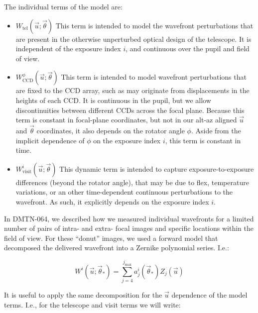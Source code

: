 \documentclass{article}
\begin{document}
The individual terms of the model are:

\begin{itemize}

  \item $W_\mathrm{tel}\left(\vec{u}; \vec{\theta}\right)$  This term is
  intended to model the wavefront perturbations that are present in the
  otherwise unperturbed optical design of the telescope.  It is independent of
  the exposure index $i$, and continuous over the pupil and field of view.

  \item $W_\mathrm{CCD}^\phi\left(\vec{u}; \vec{\theta}\right)$  This term is
  intended to model wavefront perturbations that are fixed to the CCD array,
  such as may originate from displacements in the heights of each CCD. It is
  continuous in the pupil, but we allow discontinuities between different CCDs
  across the focal plane.  Because this term is constant in focal-plane
  coordinates, but not in our alt-az aligned $\vec{u}$ and $\vec{\theta}$
  coordinates, it also depends on the rotator angle $\phi$.  Aside from the
  implicit dependence of $\phi$ on the exposure index $i$, this term is constant
  in time.

  \item $W_\mathrm{visit}^i\left(\vec{u}; \vec{\theta}\right)$  This dynamic
  term is intended to capture exposure-to-exposure differences (beyond the
  rotator angle), that may be due to flex, temperature variations, or an other
  time-dependent continuous perturbations to the wavefront.  As such, it
  explicitly depends on the exposure index $i$.

\end{itemize}

In DMTN-064, we described how we measured individual wavefronts for a limited
number of pairs of intra- and extra- focal images and specific locations within
the field of view.  For these ``donut'' images, we used a forward model that
decomposed the delivered wavefront into a Zernike polynomial series.  I.e.:

\begin{equation}
    W^i\left(\vec{u}; \vec{\theta}_\ast\right) = \sum_{j=4}^{j_\mathrm{max}} a_j^i(\vec{\theta}_\ast) Z_j(\vec{u})
\end{equation}

It is useful to apply the same decomposition for the $\vec{u}$ dependence of the
model terms.  I.e., for the telescope and visit terms we will write:
\end{document}
